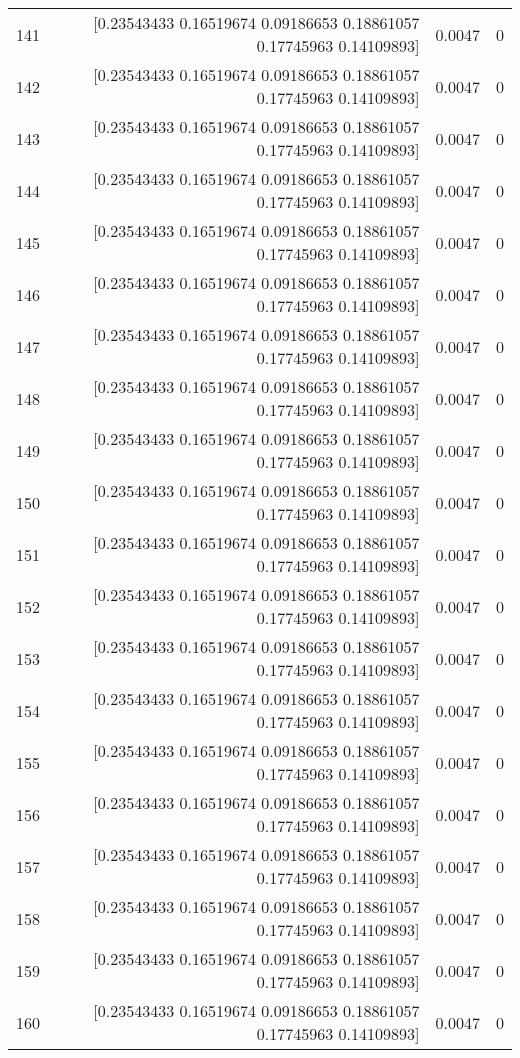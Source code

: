 \begin{longtable}{lrrr}
141 & [0.23543433 0.16519674 0.09186653 0.18861057 0.17745963 0.14109893] & 0.0047 & 0 \\
142 & [0.23543433 0.16519674 0.09186653 0.18861057 0.17745963 0.14109893] & 0.0047 & 0 \\
143 & [0.23543433 0.16519674 0.09186653 0.18861057 0.17745963 0.14109893] & 0.0047 & 0 \\
144 & [0.23543433 0.16519674 0.09186653 0.18861057 0.17745963 0.14109893] & 0.0047 & 0 \\
145 & [0.23543433 0.16519674 0.09186653 0.18861057 0.17745963 0.14109893] & 0.0047 & 0 \\
146 & [0.23543433 0.16519674 0.09186653 0.18861057 0.17745963 0.14109893] & 0.0047 & 0 \\
147 & [0.23543433 0.16519674 0.09186653 0.18861057 0.17745963 0.14109893] & 0.0047 & 0 \\
148 & [0.23543433 0.16519674 0.09186653 0.18861057 0.17745963 0.14109893] & 0.0047 & 0 \\
149 & [0.23543433 0.16519674 0.09186653 0.18861057 0.17745963 0.14109893] & 0.0047 & 0 \\
150 & [0.23543433 0.16519674 0.09186653 0.18861057 0.17745963 0.14109893] & 0.0047 & 0 \\
151 & [0.23543433 0.16519674 0.09186653 0.18861057 0.17745963 0.14109893] & 0.0047 & 0 \\
152 & [0.23543433 0.16519674 0.09186653 0.18861057 0.17745963 0.14109893] & 0.0047 & 0 \\
153 & [0.23543433 0.16519674 0.09186653 0.18861057 0.17745963 0.14109893] & 0.0047 & 0 \\
154 & [0.23543433 0.16519674 0.09186653 0.18861057 0.17745963 0.14109893] & 0.0047 & 0 \\
155 & [0.23543433 0.16519674 0.09186653 0.18861057 0.17745963 0.14109893] & 0.0047 & 0 \\
156 & [0.23543433 0.16519674 0.09186653 0.18861057 0.17745963 0.14109893] & 0.0047 & 0 \\
157 & [0.23543433 0.16519674 0.09186653 0.18861057 0.17745963 0.14109893] & 0.0047 & 0 \\
158 & [0.23543433 0.16519674 0.09186653 0.18861057 0.17745963 0.14109893] & 0.0047 & 0 \\
159 & [0.23543433 0.16519674 0.09186653 0.18861057 0.17745963 0.14109893] & 0.0047 & 0 \\
160 & [0.23543433 0.16519674 0.09186653 0.18861057 0.17745963 0.14109893] & 0.0047 & 0 \\

\end{longtable}

